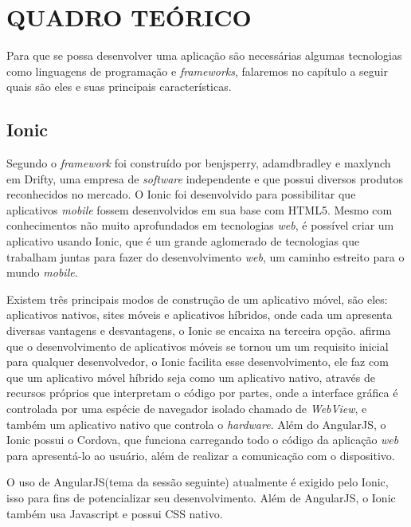 \chapter{QUADRO TEÓRICO}

	\par Para que se possa desenvolver uma aplicação são necessárias algumas tecnologias como linguagens de programação e \textit{frameworks}, falaremos no capítulo a seguir quais são eles e suas principais características.

\section{Ionic}
	\par Segundo  o \textit{framework} foi construído por benjsperry, adamdbradley e maxlynch em Drifty, uma empresa de \textit{software} independente e que possui diversos produtos reconhecidos no mercado. O Ionic foi desenvolvido para possibilitar que aplicativos \textit{mobile} fossem desenvolvidos em sua base com HTML5. Mesmo com conhecimentos não muito aprofundados em tecnologias \textit{web}, é possível criar um aplicativo usando Ionic, que é um grande aglomerado de tecnologias que trabalham juntas para fazer do desenvolvimento \textit{web}, um caminho estreito para o mundo \textit{mobile}.
	\par Existem três principais modos de construção de um aplicativo móvel, são eles: aplicativos nativos, sites móveis e aplicativos híbridos, onde cada um apresenta diversas vantagens e desvantagens, o Ionic se encaixa na terceira opção.  afirma que o desenvolvimento de aplicativos móveis se tornou um um requisito inicial para qualquer desenvolvedor, o Ionic facilita esse desenvolvimento, ele faz com que um aplicativo móvel híbrido seja como um aplicativo nativo, através de recursos próprios que interpretam o código por partes, onde a interface gráfica é controlada por uma espécie de navegador isolado chamado de \textit{WebView}, e também um aplicativo nativo que controla o \textit{hardware}. Além do AngularJS, o Ionic possui o Cordova, que funciona carregando todo o código da aplicação \textit{web} para apresentá-lo ao usuário, além de realizar a comunicação com o dispositivo.
	\par O uso de AngularJS(tema da sessão seguinte) atualmente é exigido pelo Ionic, isso para fins de potencializar seu desenvolvimento. Além de AngularJS, o Ionic também usa Javascript e possui CSS nativo.
	
